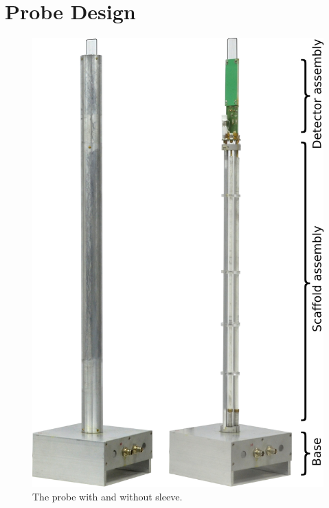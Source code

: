 \documentclass[preprint,5p]{elsarticle}
\begin{document}
\section{Probe Design}
\label{sec:probe-design}
\begin{figure}
\centering
\includegraphics[width=.5\linewidth,keepaspectratio=true]{./figures/ms5n17-tlp-im-181218-probe.png} 
\caption{The probe with and without sleeve.}
\label{fig:probe} 
\end{figure}
\end{document}
